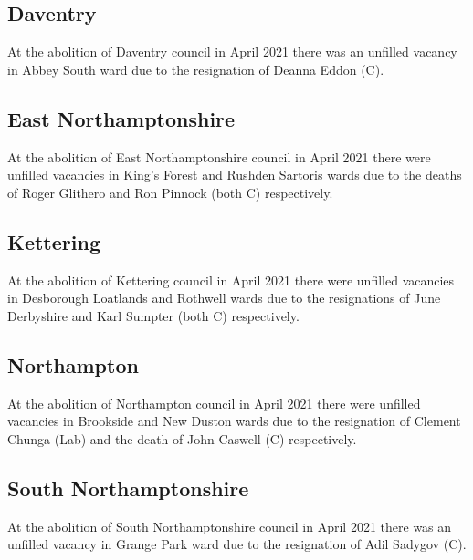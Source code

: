 \documentclass[a4paper,openany]{book}
\begin{document}
\begin{resultsiii}
\subsection*{Daventry}

At the abolition of Daventry council in April 2021 there was an unfilled vacancy in Abbey South ward due to the resignation of Deanna Eddon (C).

\subsection*{East Northamptonshire}

At the abolition of East Northamptonshire council in April 2021 there were unfilled vacancies in King's Forest and Rushden Sartoris wards due to the deaths of Roger Glithero and Ron Pinnock (both C) respectively.

\subsection*{Kettering}

At the abolition of Kettering council in April 2021 there were unfilled vacancies in Desborough Loatlands and Rothwell wards due to the resignations of June Derbyshire and Karl Sumpter (both C) respectively.

\subsection*{Northampton}

At the abolition of Northampton council in April 2021 there were unfilled vacancies in Brookside and New Duston wards due to the resignation of Clement Chunga (Lab) and the death of John Caswell (C) respectively.

\subsection*{South Northamptonshire}

At the abolition of South Northamptonshire council in April 2021 there was an unfilled vacancy in Grange Park ward due to the resignation of Adil Sadygov (C).


\end{resultsiii}
\end{document}
